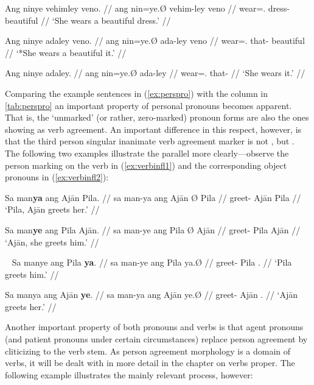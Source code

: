 \pex\label{ex:procompldist}
\a\begingl
	\gla Ang ninye vehimley veno. //
	\glb ang nin=ye.Ø vehim-ley veno //
	\glc \Aarg{} wear=\TsgF{}.\Top{} dress-\PargI{} beautiful //
	\glft `She wears a beautiful dress.' //
\endgl

\a\ljudge* \begingl
	\gla Ang ninye adaley veno. //
	\glb ang nin=ye.Ø ada-ley veno //
	\glc \Aarg{} wear=\TsgF{}.\Top{} that-\PargI{} beautiful //
	\glft `*She wears a beautiful it.' //
\endgl

\a\begingl
	\gla Ang ninye adaley. //
	\glb ang nin=ye.Ø ada-ley //
	\glc \Aarg{} wear=\TsgF{}.\Top{} that-\PargI{} //
	\glft `She wears it.' //
\endgl

\xe

Comparing the example sentences in (\ref{ex:perspro}) with the \Top{} column in
\autoref{tab:perspro} an important property of personal pronouns becomes 
apparent. That is, the `unmarked' (or rather, zero-marked) pronoun forms are 
also the ones showing as verb agreement. An important difference in this 
respect, however, is that the third person singular inanimate verb agreement 
marker is not , but . The following two examples 
illustrate the parallel more clearly---observe the person marking on the verb 
in (\ref{ex:verbinfl1}) and the corresponding object pronouns in 
(\ref{ex:verbinfl2}):

\pex\label{ex:verbinfl1}
\a\begingl
	\gla Sa man\textbf{ya} ang Ajān {} Pila. //
	\glb sa man-ya ang ​Ajān Ø ​Pila //
	\glc \PatT{} greet-\TsgM{} \Aarg{} ​Ajān \Top{} ​Pila //
	\glft `Pila, Ajān greets her.' //
\endgl

\a\begingl
	\gla Sa man\textbf{ye} ang Pila {} Ajān. //
	\glb sa man-ye ang Pila Ø ​Ajān //
	\glc \PatT{} greet-\TsgF{} \Aarg{} Pila \Top{} ​Ajān //
	\glft `Ajān, she greets him.' //
\endgl

\xe

\pex~\label{ex:verbinfl2}
\a\begingl
	\gla Sa manye ang Pila \textbf{ya}. //
	\glb sa man-ye ang Pila ya.Ø //
	\glc \PatT{} greet-\TsgF{} \Aarg{} Pila \TsgM{}.\Top{} //
	\glft `Pila greets him.' //
\endgl

\a\begingl
	\gla Sa manya ang Ajān \textbf{ye}. //
	\glb sa man-ya ang ​Ajān ye.Ø //
	\glc \PatT{} greet-\TsgM{} \Aarg{} ​Ajān \TsgF{}.\Top{} //
	\glft `Ajān greets her.' //
\endgl

\xe

Another important property of both pronouns and verbs is that agent pronouns
(and patient pronouns under certain circumstances) replace person agreement by
cliticizing to the verb stem. As person agreement morphology is a domain of
verbs, it will be dealt with in more detail in the chapter on verbs proper. The
following example illustrates the mainly relevant process, however:

